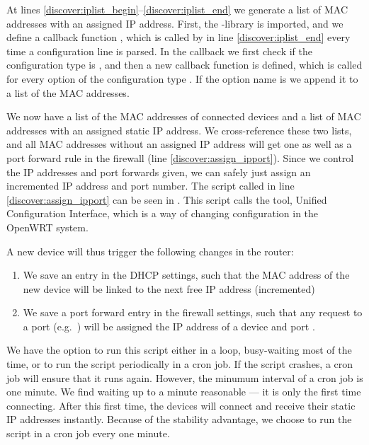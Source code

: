 At lines \ref{discover:iplist_begin}--\ref{discover:iplist_end} we generate a list of MAC addresses with an assigned IP address. First, the -library is imported, and we define a callback function , which is called by  in line \ref{discover:iplist_end} every time a configuration line is parsed. In the callback we first check if the configuration type is , and then a new callback function  is defined, which is called for every option of the configuration type . If the option name is  we append it to a list of the MAC addresses.



We now have a list of the MAC addresses of connected devices and a list of MAC addresses with an assigned static IP address. We cross-reference these two lists, and all MAC addresses without an assigned IP address will get one as well as a port forward rule in the firewall (line \ref{discover:assign_ipport}). Since we control the IP addresses and port forwards given, we can safely just assign an incremented IP address and port number. The script called in line \ref{discover:assign_ipport} can be seen in . This script calls the  tool, Unified Configuration Interface, which is a way of changing configuration in the OpenWRT system.



A new device will thus trigger the following changes in the router:
\begin{enumerate}
  \item We save an entry in the DHCP settings, such that the MAC address of the new device will be linked to the next free IP address (incremented)
  \item We save a port forward entry in the firewall settings, such that any request to a port (e.g.\ ) will be assigned the IP address of a device and port .
\end{enumerate}

We have the option to run this script either in a loop, busy-waiting most of the time, or to run the script periodically in a cron job. If the script crashes, a cron job will ensure that it runs again. However, the minumum interval of a cron job is one minute. We find waiting up to a minute reasonable --- it is only the first time connecting. After this first time, the devices will connect and receive their static IP addresses instantly. Because of the stability advantage, we choose to run the script in a cron job every one minute.


